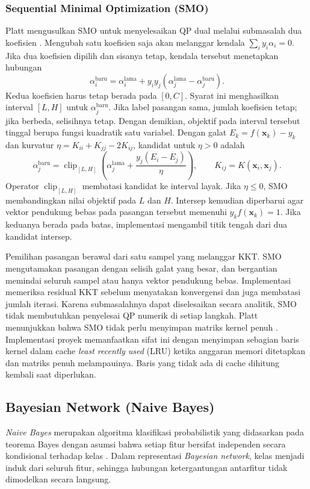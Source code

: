 \subsubsection{Sequential Minimal Optimization (SMO)}
\label{sec:svm-smo}
Platt mengusulkan SMO untuk menyelesaikan QP dual melalui submasalah dua
koefisien \cite[bagian~2]{ref:platt-1998}. Mengubah satu koefisien saja akan
melanggar kendala $\sum_i y_i\alpha_i=0$. Jika dua koefisien dipilih dan
sisanya tetap, kendala tersebut menetapkan hubungan
\[
\alpha_i^{\mathrm{baru}}=\alpha_i^{\mathrm{lama}}+y_i y_j(\alpha_j^{\mathrm{lama}}-\alpha_j^{\mathrm{baru}}).
\]
Kedua koefisien harus tetap berada pada $[0,C]$. Syarat ini menghasilkan
interval $[L,H]$ untuk $\alpha_j^{\mathrm{baru}}$. Jika label pasangan sama,
jumlah koefisien tetap; jika berbeda, selisihnya tetap. Dengan demikian,
objektif pada interval tersebut tinggal berupa fungsi kuadratik satu
variabel. Dengan galat $E_k=f(\mathbf{x}_k)-y_k$ dan kurvatur
$\eta=K_{ii}+K_{jj}-2K_{ij}$, kandidat untuk $\eta>0$ adalah
\[
\alpha_j^{\mathrm{baru}}=\operatorname{clip}_{[L,H]}
\left(\alpha_j^{\mathrm{lama}}+\frac{y_j(E_i-E_j)}{\eta}\right),
\qquad K_{ij}=K(\mathbf{x}_i,\mathbf{x}_j).
\]
Operator $\operatorname{clip}_{[L,H]}$ membatasi kandidat ke interval
layak. Jika $\eta\leq 0$, SMO membandingkan nilai objektif pada $L$ dan
$H$. Intersep kemudian diperbarui agar vektor pendukung bebas pada
pasangan tersebut memenuhi $y_k f(\mathbf{x}_k)=1$. Jika keduanya berada
pada batas, implementasi mengambil titik tengah dari dua kandidat
intersep.

Pemilihan pasangan berawal dari satu sampel yang melanggar KKT. SMO
mengutamakan pasangan dengan selisih galat yang besar, dan bergantian
memindai seluruh sampel atau hanya vektor pendukung bebas. Implementasi
memeriksa residual KKT sebelum menyatakan konvergensi dan juga membatasi
jumlah iterasi. Karena submasalahnya dapat diselesaikan secara analitik,
SMO tidak membutuhkan penyelesai QP numerik di setiap langkah. Platt
menunjukkan bahwa SMO tidak perlu menyimpan matriks kernel penuh
\cite{ref:platt-1998}. Implementasi proyek memanfaatkan sifat ini dengan
menyimpan sebagian baris kernel dalam cache \textit{least recently used}
(LRU) ketika anggaran memori ditetapkan dan matriks penuh melampauinya.
Baris yang tidak ada di cache dihitung kembali saat diperlukan.

\subsection{Bayesian Network (Naive Bayes)}
\textit{Naive Bayes} merupakan algoritma klasifikasi probabilistik yang didasarkan pada teorema Bayes dengan asumsi bahwa setiap fitur bersifat independen secara kondisional terhadap kelas \cite{ref:materi-14}. Dalam representasi \textit{Bayesian network}, kelas menjadi induk dari seluruh fitur, sehingga hubungan ketergantungan antarfitur tidak dimodelkan secara langsung.

